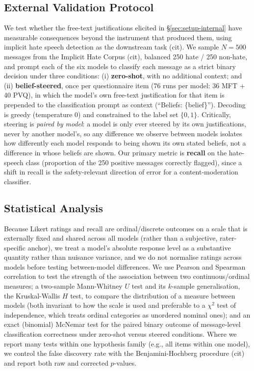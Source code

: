 \subsection{External Validation Protocol} \label{sec:setup-external}
We test whether the free-text justifications elicited in \S\ref{sec:setup-internal}
have measurable consequences beyond the instrument that produced them, using implicit
hate speech detection as the downstream task (cit). We sample $N=500$ messages from the
Implicit Hate Corpus (cit), balanced 250 hate / 250 non-hate, and prompt each of the
six models to classify each message as a strict binary decision under three
conditions: (i) \textbf{zero-shot}, with no additional context; and (ii) \textbf{belief-steered},
once per questionnaire item (76 runs per model: 36 MFT + 40 PVQ), in which the
model's own free-text justification for that item is prepended to the classification
prompt as context (``Beliefs: \{belief\}''). Decoding is greedy (temperature 0) and
constrained to the label set $\{0,1\}$. Critically, steering is \emph{paired by model}:
a model is only ever steered by its own justifications, never by another model's, so
any difference we observe between models isolates how differently each model responds
to being shown its own stated beliefs, not a difference in whose beliefs are shown.
Our primary metric is \textbf{recall} on the hate-speech class (proportion of the 250
positive messages correctly flagged), since a shift in recall is the safety-relevant
direction of error for a content-moderation classifier.

\subsection{Statistical Analysis} \label{sec:setup-stats}
Because Likert ratings and recall are ordinal/discrete outcomes on a scale that is
externally fixed and shared across all models (rather than a subjective, rater-specific
anchor), we treat a model's absolute response level as a substantive quantity rather
than nuisance variance, and we do not normalise ratings across models before testing
between-model differences. We use Pearson and Spearman correlation to test the
strength of the association between two continuous/ordinal measures; a two-sample
Mann-Whitney $U$ test and its $k$-sample generalisation, the Kruskal-Wallis $H$ test,
to compare the distribution of a measure between models (both invariant to how the
scale is used and preferable to a $\chi^2$ test of independence, which treats ordinal
categories as unordered nominal ones); and an exact (binomial) McNemar test for the
paired binary outcome of message-level classification correctness under zero-shot
versus steered conditions. Where we report many tests within one hypothesis family
(e.g., all items within one model), we control the false discovery rate with the
Benjamini-Hochberg procedure (cit) and report both raw and corrected $p$-values.



